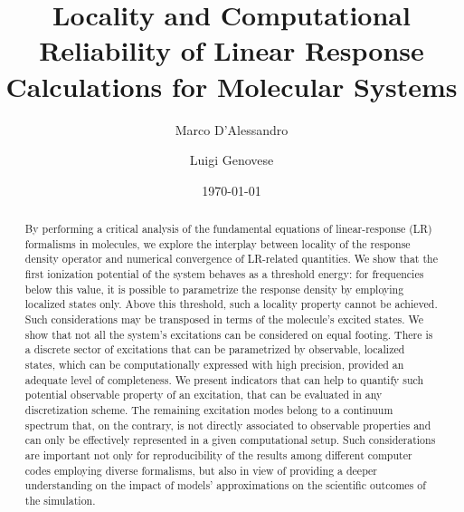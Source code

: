 \documentclass[reprint,aps,prb]{revtex4-1}
\begin{document}


\title{Locality and Computational Reliability of Linear Response Calculations for Molecular Systems}
\author{Marco D'Alessandro}
\author{Luigi Genovese}
\date{\today}

\begin{abstract}
By performing a critical analysis of the fundamental equations of linear-response  (LR) formalisms in molecules, 
we explore the interplay between locality of the response density operator and  numerical convergence of LR-related quantities.
We show that the first ionization potential of the system behaves as a threshold energy: for frequencies below this value, it is possible to parametrize the response density by employing localized states only. Above this threshold, such a locality property cannot be achieved. 
Such considerations may be transposed in terms of the molecule's excited states. We show that not all the system's excitations can be considered on equal footing.
There is a discrete sector of excitations that can be parametrized by observable, localized states, which can be computationally expressed with high precision, provided an adequate level of completeness. 
We present indicators that can help to quantify such potential observable property of an excitation, that can be evaluated 
in any discretization scheme.  
The remaining excitation modes belong to a continuum spectrum that, on the contrary, is not directly associated to observable properties and can only be effectively represented in a given computational setup.
Such considerations are important not only for reproducibility of the results among different computer codes 
employing diverse formalisms, but also in view of providing a deeper understanding on the impact of models' 
approximations on the scientific outcomes of the simulation.
\end{abstract}

\maketitle
\end{document}
